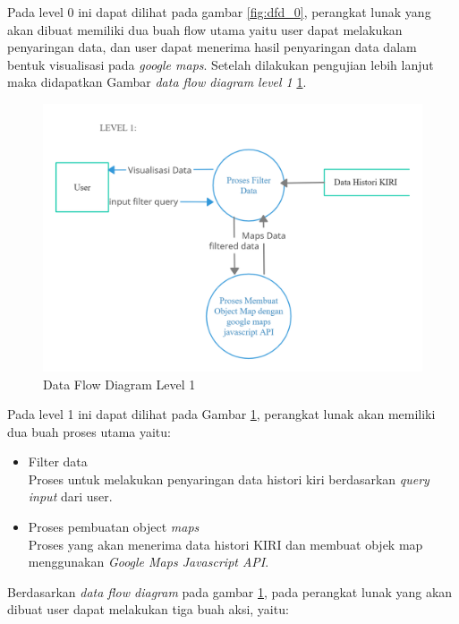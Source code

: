 Pada level 0 ini dapat dilihat pada gambar \ref{fig:dfd_0}, perangkat lunak yang akan dibuat memiliki dua buah flow utama yaitu user dapat melakukan penyaringan data, dan user dapat menerima hasil penyaringan data dalam bentuk visualisasi pada \textit{google maps}. Setelah dilakukan pengujian lebih lanjut maka didapatkan Gambar \textit{data flow diagram level 1} \ref{fig:dfd_1}.

\begin{figure}[H]
	\centering  
	\includegraphics[scale=0.3]{Gambar/DFD_1.png}  
	\caption[Data Flow Diagram Level 1]{Data Flow Diagram Level 1} 
	\label{fig:dfd_1} 
\end{figure} 

Pada level 1 ini dapat dilihat pada Gambar \ref{fig:dfd_1}, perangkat lunak akan memiliki dua buah proses utama yaitu:
\begin{itemize}
    \item Filter data \\
    Proses untuk melakukan penyaringan data histori kiri berdasarkan \textit{query input} dari user.
    \item Proses pembuatan object \textit{maps}\\
    Proses yang akan menerima data histori KIRI dan membuat objek map menggunakan \textit{Google Maps Javascript API}.
\end{itemize}

Berdasarkan \textit{data flow diagram } pada gambar \ref{fig:dfd_1}, pada perangkat lunak yang akan dibuat user dapat melakukan tiga buah aksi, yaitu:

